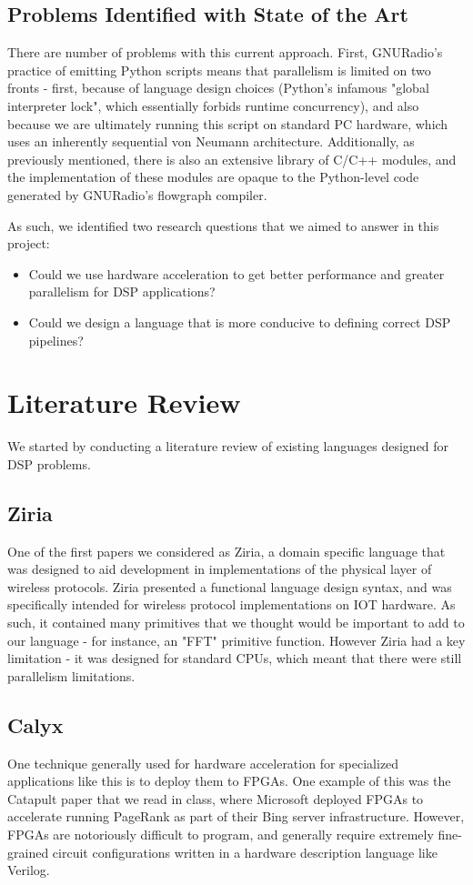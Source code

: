 \documentclass[12pt]{article}
\begin{document}
\subsection{Problems Identified with State of the Art}
There are number of problems with this current approach. First, GNURadio's practice of emitting Python scripts means that parallelism is
limited on two fronts - first, because of language design choices (Python's infamous "global interpreter lock", which essentially forbids
runtime concurrency), and also because we are ultimately running this script on standard PC hardware, which uses an inherently sequential
von Neumann architecture. Additionally, as previously mentioned, there is also an extensive library of C/C++ modules, and the implementation
of these modules are opaque to the Python-level code generated by GNURadio's flowgraph compiler.

As such, we identified two research questions that we aimed to answer in this project:

\begin{itemize}
    \item Could we use hardware acceleration to get better performance and greater parallelism for DSP applications?
    \item Could we design a language that is more conducive to defining correct DSP pipelines?
\end{itemize}

\section{Literature Review}
We started by conducting a literature review of existing languages designed for DSP problems.
\subsection{Ziria}
One of the first papers we considered as Ziria, a domain specific language that was
designed to aid development in implementations of the physical layer of wireless protocols.
Ziria presented a functional language design syntax, and was specifically intended for wireless protocol
implementations on IOT hardware. As such, it contained many primitives that we thought would
be important to add to our language - for instance, an "FFT" primitive function. However Ziria had a key limitation -
it was designed for standard CPUs, which meant that there were still parallelism limitations.

\subsection{Calyx}
One technique generally used for hardware acceleration for specialized applications like this
is to deploy them to FPGAs. One example of this was the Catapult paper that we read in class,
where Microsoft deployed FPGAs to accelerate running PageRank as part of their Bing server infrastructure.
However, FPGAs are notoriously difficult to program, and generally require extremely fine-grained circuit
configurations written in a hardware description language like Verilog.
\end{document}
